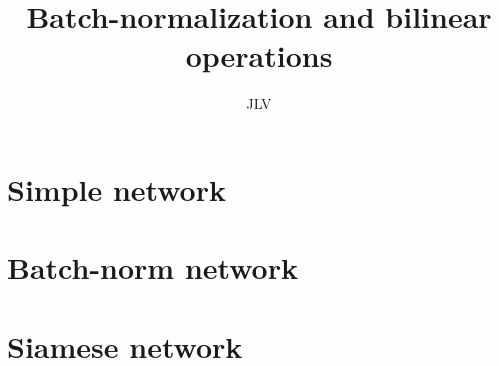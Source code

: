 \documentclass[oneside,10pt]{book}
\title{Batch-normalization and bilinear operations}
\author{JLV}
\begin{document}
\maketitle

\chapter{Simple network}


\chapter{Batch-norm network}


\chapter{Siamese network}

\end{document}
